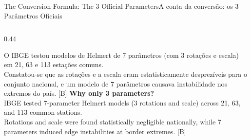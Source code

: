 \documentclass[aspectratio=169,11pt]{beamer}
\newcommand{\tr}[2]{\ifEN#2\else#1\fi}
\begin{document}
\begin{frame}{\tr{A conta da conversão: os 3 Parâmetros Oficiais}{The Conversion Formula: The 3 Official Parameters}}
\begin{columns}[onlytextwidth]
\begin{column}{0.44\textwidth}
\begin{regra}
{        O IBGE testou modelos de Helmert de 7 parâmetros (com 3 rotações e escala) em 21, 63 e 113
        estações comuns.\\[3pt]
        Constatou-se que as rotações e a escala eram estatisticamente desprezíveis para o conjunto
        nacional, e um modelo de 7 parâmetros causava instabilidade nos extremos do país. [B]}{
        \textbf{Why only 3 parameters?}\\[3pt]
        IBGE tested 7-parameter Helmert models (3 rotations and scale) across 21, 63, and 113 common
        stations.\\[3pt]
        Rotations and scale were found statistically negligible nationally, while 7 parameters
        induced edge instabilities at border extremes. [B]}
      \end{regra}
    \end{column}
  \end{columns}
\end{frame}
\end{document}
